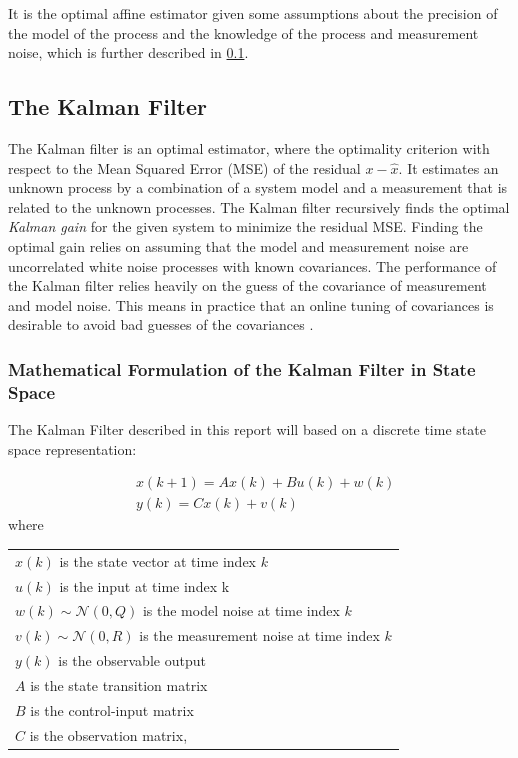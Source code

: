 It is the optimal affine estimator given some assumptions about the precision of the model of the process and the knowledge of the process and measurement noise, which is further described in \cref{sec:the_kalman_filter}.





\subsection{The Kalman Filter} \label{sec:the_kalman_filter}
The Kalman filter is an optimal estimator, where the optimality criterion with respect to the Mean Squared Error (MSE) of the residual $x-\hat{x}$.
It estimates an unknown process by a combination of a system model and a measurement that is related to the unknown processes. The Kalman filter recursively finds the optimal \textit{Kalman gain} for the given system to minimize the residual MSE. Finding the optimal gain relies on assuming that the model and measurement noise are uncorrelated white noise processes with known covariances. The performance of the Kalman filter relies heavily on the guess of the covariance of measurement and model noise. This means in practice that an online tuning of covariances is desirable to avoid bad guesses of the covariances \cite[p. 232]{Doraiswami2014}.

\subsubsection{Mathematical Formulation of the Kalman Filter in State Space}
The Kalman Filter described in this report will based on a discrete time state space representation: 

\begin{align}
	&{x}(k+1) = {A}{x}(k) + {B}{u}(k) + {w}(k)  \label{eq:KalmanSystemEquations} \\
	&{y}(k) = {C}{x}(k)+{v}(k) 
\end{align}
where

\begin{center}
	\begin{tabular}{l}
		$x(k)$ is the state vector at time index $k$	\\
		$u(k)$ is the input at time index k	\\
		$w(k)  \sim \mathcal{N}(0, Q)$  is the model noise at time index $ k $	\\
		$v(k) \sim \mathcal{N}(0, R) $  is the measurement noise at time index $ k $	\\
		$ y(k) $ is the observable output								\\
		$ A $ is the state transition matrix \\
		$ B $ is the control-input matrix				\\
		$ C $ is the observation matrix, 					\\
	\end{tabular}
\end{center}


